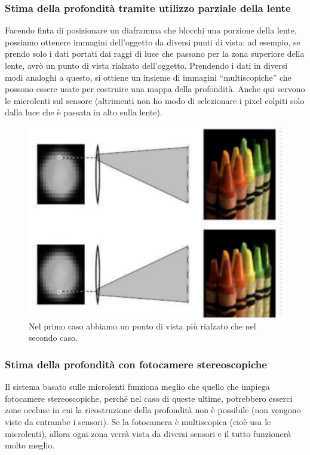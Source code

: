 \documentclass[a4paper,11pt]{article}
\begin{document}
\subsubsection{Stima della profondità tramite utilizzo parziale della lente}
Facendo finta di posizionare un diaframma che blocchi una porzione della lente, possiamo ottenere immagini dell'oggetto
da diversi punti di vista: ad esempio, se prendo solo i dati portati dai raggi di luce che passano per la zona superiore della lente, avrò
un punto di vista rialzato dell'oggetto. Prendendo i dati in diversi modi analoghi a questo, si ottiene un insieme di immagini ``multiscopiche'' che possono essere usate
per costruire una mappa della profondità. Anche qui servono le microlenti sul sensore (altrimenti non ho modo di selezionare i pixel colpiti solo dalla luce che è passata in alto sulla lente).

\renewcommand{\thefigure}{3.27}
\begin{figure}[!h]
  \centering
    \includegraphics[scale=0.4]{images/3/depth.png}
    \caption{Nel primo caso abbiamo un punto di vista più rialzato che nel secondo caso.}
\end{figure}

\subsubsection{Stima della profondità con fotocamere stereoscopiche}
Il sistema basato sulle microlenti funziona meglio che quello che impiega fotocamere stereoscopiche, perché nel caso di queste ultime, potrebbero esserci zone occluse
in cui la ricostruzione della profondità non è possibile (non vengono viste da entrambe i sensori). Se la fotocamera è multiscopica (cioè usa le microlenti), allora ogni zona verrà vista da diversi sensori
e il tutto funzionerà molto meglio.
\end{document}
